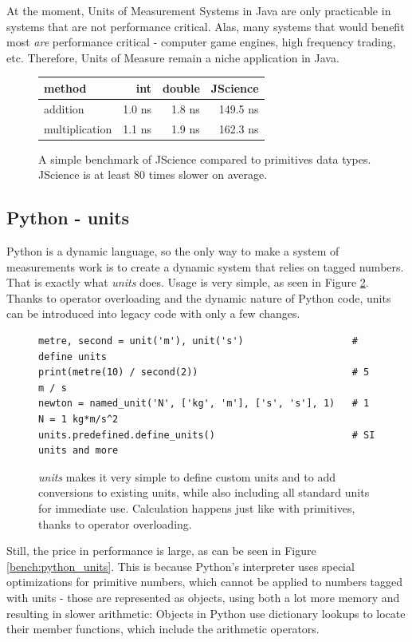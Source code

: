 \documentclass[12pt,oneside,a4paper]{scrbook}
\begin{document}
At the moment, Units of Measurement Systems in Java are only practicable in systems that are not performance critical. Alas, many systems that would benefit most \emph{are} performance critical - computer game engines, high frequency trading, etc. Therefore, Units of Measure remain a niche application in Java.

\begin{figure}
\begin{tabular}{lrrr}
method          & int    & double  & JScience \\
\midrule
addition        & 1.0 ns &  1.8 ns    &   149.5 ns \\
multiplication  & 1.1 ns &  1.9 ns    &   162.3 ns
\end{tabular}
\caption{A simple benchmark of JScience compared to primitives data types. JScience is at least 80 times slower on average.}
\label{bench:jscience}
\end{figure}


\subsection{Python - units}

Python is a dynamic language, so the only way to make a system of measurements work is to create a dynamic system that relies on tagged numbers. That is exactly what \emph{units} \citep{Donohue12} does. Usage is very simple, as seen in Figure \ref{code:python_units}. Thanks to operator overloading and the dynamic nature of Python code, units can be introduced into legacy code with only a few changes.

\begin{figure}
\begin{verbatim}
metre, second = unit('m'), unit('s')                   # define units
print(metre(10) / second(2))                           # 5 m / s
newton = named_unit('N', ['kg', 'm'], ['s', 's'], 1)   # 1 N = 1 kg*m/s^2
units.predefined.define_units()                        # SI units and more
\end{verbatim}
\caption{\emph{units} makes it very simple to define custom units and to add conversions to existing units, while also including all standard units for immediate use. Calculation happens just like with primitives, thanks to operator overloading.}
\label{code:python_units}
\end{figure}

Still, the price in performance is large, as can be seen in Figure \ref{bench:python_units}. This is because Python's interpreter uses special optimizations for primitive numbers, which cannot be applied to numbers tagged with units - those are represented as objects, using both a lot more memory and resulting in slower arithmetic: Objects in Python use dictionary lookups to locate their member functions, which include the arithmetic operators.
\end{document}
